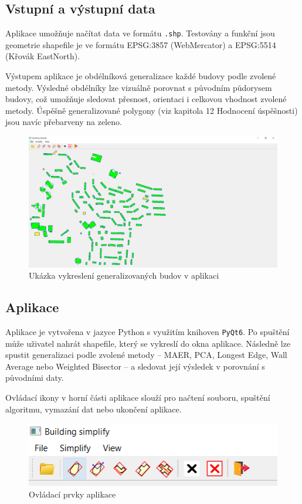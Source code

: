 \documentclass[a4paper,12pt]{article}
\begin{document}
\subsection{Vstupní a výstupní data}

Aplikace umožňuje načítat data ve formátu \texttt{.shp}. Testovány a funkční jsou geometrie shapefile je ve formátu EPSG:3857 (WebMercator) a EPSG:5514 (Křovák EastNorth).

Výstupem aplikace je obdélníková generalizace každé budovy podle zvolené metody. Výsledné obdélníky lze vizuálně porovnat s původním půdorysem budovy, což umožňuje sledovat přesnost, orientaci i celkovou vhodnost zvolené metody. Úspěšně generalizované polygony (viz kapitola 12 Hodnocení úspěšnosti) jsou navíc přebarveny na zeleno.

\begin{figure}[H]
    \centering
    \includegraphics[width=1\linewidth]{app1.png}
    \caption{Ukázka vykreslení generalizovaných budov v aplikaci}
    \label{fig:app_preview}
\end{figure}

\subsection{Aplikace}

Aplikace je vytvořena v jazyce Python s využitím knihoven \texttt{PyQt6}. Po spuštění může uživatel nahrát shapefile, který se vykreslí do okna aplikace. Následně lze spustit generalizaci podle zvolené metody – MAER, PCA, Longest Edge, Wall Average nebo Weighted Bisector – a sledovat její výsledek v porovnání s původními daty.

Ovládací ikony v horní části aplikace slouží pro načtení souboru, spuštění algoritmu, vymazání dat nebo ukončení aplikace.

\begin{figure}[H]
    \centering
    \includegraphics[width=0.5\linewidth]{app2.png}
    \caption{Ovládací prvky aplikace}
    \label{fig:gui_overview}
\end{figure}
\end{document}
